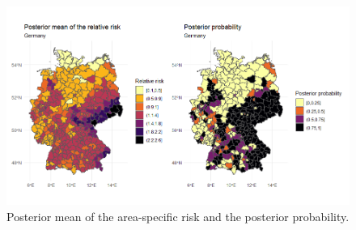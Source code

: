 \begin{figure}[H]
    \centering
    \includegraphics[width = \textwidth]{posterior_germany_infra.png}
    \caption{Posterior mean of the area-specific risk and the posterior probability.}
    \label{posteriorGermanyInfra}
\end{figure}
%     
